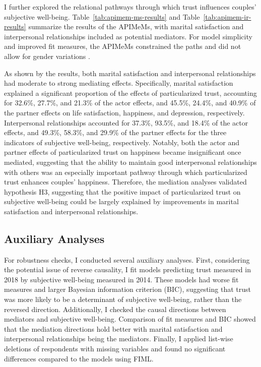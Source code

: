I further explored the relational pathways through which trust influences couples' subjective well-being. Table~\ref{tab:apimem-ms-results} and Table~\ref{tab:apimem-ir-results} summarize the results of the APIMeMs, with marital satisfaction and interpersonal relationships included as potential mediators. For model simplicity and improved fit measures, the APIMeMs constrained the paths and did not allow for gender variations \parencite{ledermannAssessingMediationDyadic2011}.

As shown by the results, both marital satisfaction and interpersonal relationships had moderate to strong mediating effects. Specifically, marital satisfaction explained a significant proportion of the effects of particularized trust, accounting for 32.6\%, 27.7\%, and 21.3\% of the actor effects, and 45.5\%, 24.4\%, and 40.9\% of the partner effects on life satisfaction, happiness, and depression, respectively. Interpersonal relationships accounted for 37.3\%, 93.5\%, and 18.4\% of the actor effects, and 49.3\%, 58.3\%, and 29.9\% of the partner effects for the three indicators of subjective well-being, respectively. Notably, both the actor and partner effects of particularized trust on happiness became insignificant once mediated, suggesting that the ability to maintain good interpersonal relationships with others was an especially important pathway through which particularized trust enhances couples' happiness. Therefore, the mediation analyses validated hypothesis H3, suggesting that the positive impact of particularized trust on subjective well-being could be largely explained by improvements in marital satisfaction and interpersonal relationships.

\subsection{Auxiliary Analyses}

For robustness checks, I conducted several auxiliary analyses. First, considering the potential issue of reverse causality, I fit models predicting trust measured in 2018 by subjective well-being measured in 2014. These models had worse fit measures and larger Bayesian information criterion (BIC), suggesting that trust was more likely to be a determinant of subjective well-being, rather than the reversed direction. Additionally, I checked the causal directions between mediators and subjective well-being. Comparison of fit measures and BIC showed that the mediation directions hold better with marital satisfaction and interpersonal relationships being the mediators. Finally, I applied list-wise deletions of respondents with missing variables and found no significant differences compared to the models using FIML.
